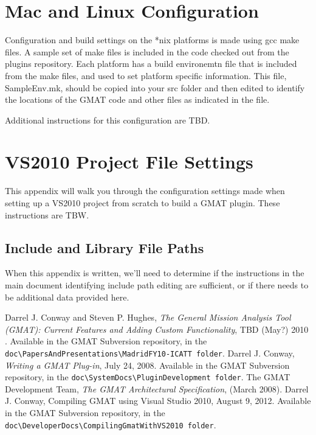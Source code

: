 \documentclass[10pt,letterpaper]{article}
\begin{document}
\appendix
\section{Mac and Linux Configuration}

Configuration and build settings on the *nix platforms is made using gcc make files.  A sample set of make files is included in the code checked out from the plugins repository.  Each platform has a build environemtn file that is included from the make files, and used to set platform specific information.  This file, SampleEnv.mk, should be copied into your src folder and then edited to identify the locations of the GMAT code and other files as indicated in the file.

Additional instructions for this configuration are TBD.

\section{\label{settings}VS2010 Project File Settings}

This appendix will walk you through the configuration settings made when setting up a VS2010 project from scratch to build a GMAT plugin.  These instructions are TBW.

\subsection{Include and Library File Paths}

When this appendix is written, we'll need to determine if the instructions in the main document identifying include path editing are sufficient, or if there needs to be additional data provided here.

\begin{thebibliography}{}
Darrel J. Conway and Steven P. Hughes, \textit{The General Mission Analysis Tool (GMAT): Current Features and Adding Custom Functionality}, TBD (May?) 2010 . Available in the GMAT Subversion repository, in the \texttt{doc{\textbackslash}PapersAndPresentations{\textbackslash}MadridFY10-ICATT folder}.
Darrel J. Conway, \textit{Writing a GMAT Plug-in}, July 24, 2008. Available in the GMAT Subversion repository, in the \texttt{doc{\textbackslash}SystemDocs{\textbackslash}PluginDevelopment folder}.
 The GMAT Development Team, \textit{The GMAT Architectural Specification}, (March 2008). 
Darrel J. Conway, Compiling GMAT using Visual Studio 2010, August 9, 2012. Available in the GMAT Subversion repository, in the \texttt{doc{\textbackslash}DeveloperDocs{\textbackslash}CompilingGmatWithVS2010 folder}.

\end{thebibliography}
\end{document}
